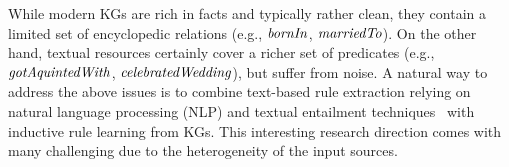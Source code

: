   While modern KGs are rich in facts and typically rather clean, they contain a limited set of encyclopedic relations (e.g., $\mathit{bornIn}$, $\mathit{marriedTo}$). On the other hand, textual resources certainly cover a richer set of predicates (e.g., $\mathit{gotAquintedWith}$, $\mathit{celebratedWedding}$), but suffer from  noise. %
A natural way to address the %
above issues is to combine 
text-based rule extraction relying on natural language processing (NLP) and textual entailment techniques~\cite{Schoenmackers:2010,Gordon:2011,dragoni2016} with inductive rule learning from KGs. This interesting research direction comes with many challenging due to the heterogeneity of the input sources.


